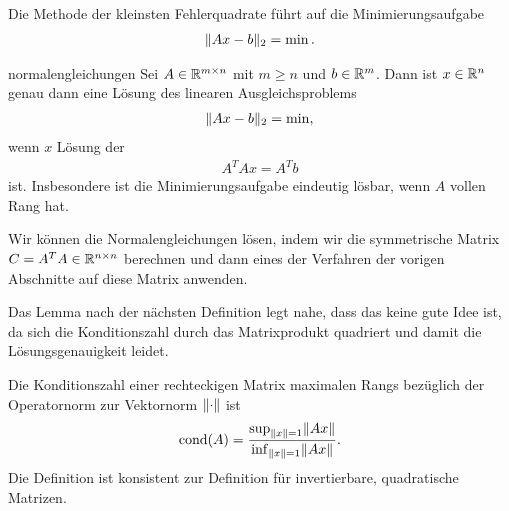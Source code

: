 \begin{intro}
  Die Methode der kleinsten Fehlerquadrate führt auf die Minimierungsaufgabe
  \begin{gather}
    \lVert Ax-b\rVert_2 = \min.
  \end{gather}
\end{intro}

\begin{Satz}{normalengleichungen}
  Sei $A\in \mathbb R^{m\times n}$ mit $m\ge n$ und $b\in \mathbb R^m$. Dann ist
  $x\in\mathbb R^n$ genau dann eine Lösung des linearen Ausgleichsproblems
  \begin{gather}
    \lVert Ax-b\rVert_2 = \min,
  \end{gather}
  wenn $x$ Lösung der 
  \begin{gather}
    A^TA x = A^Tb
  \end{gather}
  ist. Insbesondere ist die Minimierungsaufgabe eindeutig lösbar, wenn
  $A$ vollen Rang hat.
\end{Satz}

\begin{remark}
  Wir können die Normalengleichungen lösen, indem wir die symmetrische Matrix $C = A^TA\in \mathbb R^{n\times n}$ berechnen und dann eines der Verfahren der vorigen Abschnitte auf diese Matrix anwenden.
  
  Das Lemma nach der nächsten Definition legt nahe, dass das keine gute Idee ist, da sich die Konditionszahl durch das Matrixprodukt quadriert und damit die Lösungsgenauigkeit leidet.  
\end{remark}

\begin{Definition}
  Die Konditionszahl einer rechteckigen Matrix maximalen Rangs bezüglich der Operatornorm zur Vektornorm $\lVert\cdot\rVert$ ist
  \begin{gather}
    \operatorname{cond}(A) = \frac{\sup_{\lVert x\rVert=1}\lVert Ax\rVert}{\inf_{\lVert x\rVert=1}\lVert Ax\rVert}.
    \end{gather}
  Die Definition ist konsistent zur Definition für invertierbare, quadratische Matrizen.
\end{Definition}

